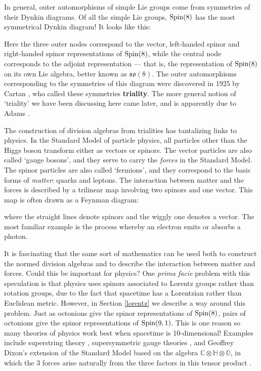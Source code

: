 \documentclass[12pt]{article}
\newcommand\C{{\mathbb C}}
\renewcommand\H{{\mathbb H}}
\renewcommand\O{{\mathbb O}}
\newcommand{\Spin}{{\rm Spin}}
\newcommand{\so}{{\mathfrak {so}}}
\newcommand{\tensor}{\otimes}
\begin{document}
In general, outer automorphisms of simple Lie groups come from
symmetries of their Dynkin diagrams.  Of all the simple Lie groups,
$\Spin(8)$ has the most symmetrical Dynkin diagram!  It looks like this:

\medskip 
\centerline{\epsfysize=1.0in}   
\label{triality.figure}   
\medskip
 
\noindent   
Here the three outer nodes correspond to the vector, left-handed spinor
and right-handed spinor representations of $\Spin(8)$, while the central
node corresponds to the adjoint representation --- that is, the
representation of $\Spin(8)$ on its own Lie algebra, better known as
$\so(8)$.  The outer automorphisms corresponding to the symmetries of
this diagram were discovered in 1925 by Cartan \cite{Cartan3}, who
called these symmetries {\bf triality}.  The more general notion of
`triality' we have been discussing here came later, and is apparently
due to Adams \cite{Adams}.
 
The construction of division algebras from trialities has tantalizing 
links to physics.   In the Standard Model of particle physics, all 
particles other than the Higgs boson transform either as vectors or 
spinors.  The vector particles are also called `gauge bosons', and they
serve to carry the {\it forces} in the Standard Model.  The spinor
particles  are also called `fermions', and they correspond to the basic
forms of {\it matter}: quarks and leptons.   The interaction between
matter and the forces is described by a trilinear map involving two
spinors and one vector.  This map is often drawn as a Feynman diagram:  

\medskip
\centerline{\epsfysize=1.0in}   
\label{feynman}   
\medskip 
\noindent  
where the straight lines denote spinors and the wiggly one denotes a 
vector.  The most familiar example is the process whereby an electron 
emits or absorbs a photon.   
 
It is fascinating that the same sort of mathematics can be used both to
construct the normed division algebras and to describe the interaction
between matter and forces.  Could this be important for physics?  One
{\it prima facie} problem with this speculation is that physics uses
spinors associated to Lorentz groups rather than rotation groups, due to
the fact that spacetime has a Lorentzian rather than Euclidean metric.
However, in Section \ref{lorentz} we describe a way around this problem.
Just as octonions give the spinor representations of $\Spin(8)$, pairs
of octonions give the spinor representations of $\Spin(9,1)$.  This is
one reason so many theories of physics work best when spacetime is
10-dimensional!  Examples include superstring theory \cite{Deligne,GSW},
supersymmetric gauge theories \cite{Evans,KT,Schray}, and Geoffrey
Dixon's extension of the Standard Model based on the algebra $\C \tensor
\H \tensor \O$, in which the 3 forces arise naturally from the three
factors in this tensor product \cite{Dixon}.
 
\end{document}
